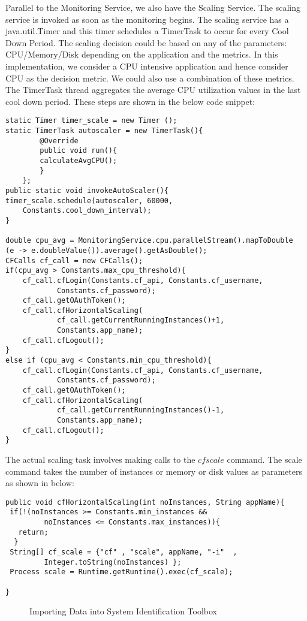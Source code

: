 \documentclass[article,type=msc,colorback,12pt,accentcolor=tud7b,table]{tudthesis}
\begin{document}
	Parallel to the Monitoring Service, we also have the Scaling Service. The scaling service is invoked as soon as the monitoring begins. The scaling service has a java.util.Timer and this timer schedules a TimerTask to occur for every Cool Down Period. The scaling decision could be based on any of the parameters: CPU/Memory/Disk depending on the application and the metrics. In this implementation, we consider a CPU intensive application and hence consider CPU as the decision metric. We could also use a combination of these metrics. The TimerTask thread aggregates the average CPU utilization values in the last cool down period. These steps are shown in the below code snippet:
\begin{lstlisting}
static Timer timer_scale = new Timer ();
static TimerTask autoscaler = new TimerTask(){
	 	@Override
	 	public void run(){
	 	calculateAvgCPU();
	 	}
 	};
public static void invokeAutoScaler(){
timer_scale.schedule(autoscaler, 60000, 
	Constants.cool_down_interval);
}

double cpu_avg = MonitoringService.cpu.parallelStream().mapToDouble
(e -> e.doubleValue()).average().getAsDouble();
CFCalls cf_call = new CFCalls();
if(cpu_avg > Constants.max_cpu_threshold){
	cf_call.cfLogin(Constants.cf_api, Constants.cf_username, 
			Constants.cf_password);
	cf_call.getOAuthToken();
	cf_call.cfHorizontalScaling(
			cf_call.getCurrentRunningInstances()+1, 
			Constants.app_name);
	cf_call.cfLogout();
}
else if (cpu_avg < Constants.min_cpu_threshold){
	cf_call.cfLogin(Constants.cf_api, Constants.cf_username, 
			Constants.cf_password);
	cf_call.getOAuthToken();
	cf_call.cfHorizontalScaling(
			cf_call.getCurrentRunningInstances()-1, 
			Constants.app_name);
	cf_call.cfLogout();
}
\end{lstlisting}
	The actual scaling task involves making calls to the $cf scale$ command. The scale command takes the number of instances or memory or disk values as parameters as shown in below:
	\begin{lstlisting}
public void cfHorizontalScaling(int noInstances, String appName){
 if(!(noInstances >= Constants.min_instances && 
		 noInstances <= Constants.max_instances)){
   return;
  }
 String[] cf_scale = {"cf" , "scale", appName, "-i"  , 
		 Integer.toString(noInstances) };
 Process scale = Runtime.getRuntime().exec(cf_scale);

}	
	\end{lstlisting}
	  \begin{figure}[h]
	  	\begin{center}
	  		\makebox[\textwidth]{\texttt{[image: D6]}}
	  	\end{center}
	  	\caption{Importing Data into System Identification Toolbox}
	  \end{figure}	
	
\end{document}
